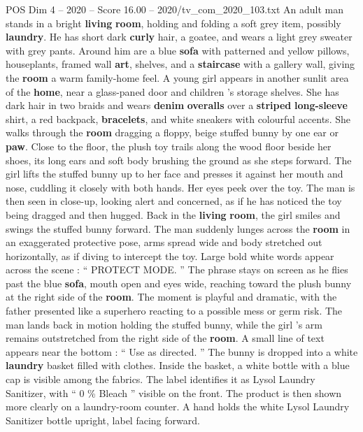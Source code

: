 \begin{textsample}{POS Dim 4 – 2020 – Score 16.00 – 2020/tv\_com\_2020\_103.txt}  \label{ex:f4_pos_012}
An adult man stands in a bright \textbf{living} \textbf{room}, holding and folding a soft grey item, possibly \textbf{laundry}.
He has short dark \textbf{curly} hair, a goatee, and wears a light grey sweater with grey pants.
Around him are a blue \textbf{sofa} with patterned and yellow pillows, houseplants, framed wall \textbf{art}, shelves, and a \textbf{staircase} with a gallery wall, giving the \textbf{room} a warm family-home feel.
A young girl appears in another sunlit area of the \textbf{home}, near a glass-paned door and children ’s storage shelves.
She has dark hair in two braids and wears \textbf{denim} \textbf{overalls} over a \textbf{striped} \textbf{long-sleeve} shirt, a red backpack, \textbf{bracelets}, and white sneakers with colourful accents.
She walks through the \textbf{room} dragging a floppy, beige stuffed bunny by one ear or \textbf{paw}.
Close to the floor, the plush toy trails along the wood floor beside her shoes, its long ears and soft body brushing the ground as she steps forward.
The girl lifts the stuffed bunny up to her face and presses it against her mouth and nose, cuddling it closely with both hands.
Her eyes peek over the toy.
The man is then seen in close-up, looking alert and concerned, as if he has noticed the toy being dragged and then hugged.
Back in the \textbf{living} \textbf{room}, the girl smiles and swings the stuffed bunny forward.
The man suddenly lunges across the \textbf{room} in an exaggerated protective pose, arms spread wide and body stretched out horizontally, as if diving to intercept the toy.
Large bold white words appear across the scene : “ PROTECT MODE. ” The phrase stays on screen as he flies past the blue \textbf{sofa}, mouth open and eyes wide, reaching toward the plush bunny at the right side of the \textbf{room}.
The moment is playful and dramatic, with the father presented like a superhero reacting to a possible mess or germ risk.
The man lands back in motion holding the stuffed bunny, while the girl ’s arm remains outstretched from the right side of the \textbf{room}.
A small line of text appears near the bottom : “ Use as directed. ” The bunny is dropped into a white \textbf{laundry} basket filled with clothes.
Inside the basket, a white bottle with a blue cap is visible among the fabrics.
The label identifies it as Lysol Laundry Sanitizer, with “ 0 \% Bleach ” visible on the front.
The product is then shown more clearly on a laundry-room counter.
A hand holds the white Lysol Laundry Sanitizer bottle upright, label facing forward.

\end{textsample}
